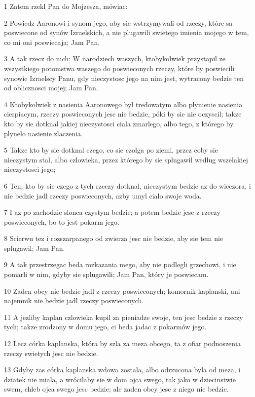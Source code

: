 \par 1 Zatem rzekl Pan do Mojzesza, mówiac:
\par 2 Powiedz Aaronowi i synom jego, aby sie wstrzymywali od rzeczy, które sa poswiecone od synów Izraelskich, a nie plugawili swietego imienia mojego w tem, co mi oni poswiecaja; Jam Pan.
\par 3 A tak rzecz do nich: W narodziech waszych, ktobykolwiek przystapil ze wszystkiego potomstwa waszego do poswieconych rzeczy, które by poswiecili synowie Izraelscy Panu, gdy nieczystosc jego na nim jest, wytracony bedzie ten od oblicznosci mojej; Jam Pan.
\par 4 Ktobykolwiek z nasienia Aaronowego byl tredowatym albo plynienie nasienia cierpiacym, rzeczy poswieconych jesc nie bedzie, póki by sie nie oczyscil; takze kto by sie dotknal jakiej nieczystosci ciala zmarlego, albo tego, z którego by plynelo nasienie zlaczenia.
\par 5 Takze kto by sie dotknal czego, co sie czolga po ziemi, przez coby sie nieczystym stal, albo czlowieka, przez którego by sie splugawil wedlug wszelakiej nieczystosci jego;
\par 6 Ten, kto by sie czego z tych rzeczy dotknal, nieczystym bedzie az do wieczora, i nie bedzie jadl rzeczy poswieconych, azby umyl cialo swoje woda.
\par 7 I az po zachodzie slonca czystym bedzie; a potem bedzie jesc z rzeczy poswieconych, bo to jest pokarm jego.
\par 8 Scierwu tez i rozszarpanego od zwierza jesc nie bedzie, aby sie tem nie splugawil; Jam Pan.
\par 9 A tak przestrzegac beda rozkazania mego, aby nie podlegli grzechowi, i nie pomarli w nim, gdyby sie splugawili; Jam Pan, który je poswiecam.
\par 10 Zaden obcy nie bedzie jadl z rzeczy poswieconych; komornik kaplanski, ani najemnik nie bedzie jadl rzeczy poswieconych.
\par 11 A jezliby kaplan czlowieka kupil za pieniadze swoje, ten jesc bedzie z rzeczy tych; takze zrodzony w domu jego, ci beda jadac z pokarmów jego.
\par 12 Lecz córka kaplanska, która by szla za meza obcego, ta z ofiar podnoszenia rzeczy swietych jesc nie bedzie.
\par 13 Gdyby zas córka kaplanska wdowa zostala, albo odrzucona byla od meza, i dziatek nie miala, a wrócilaby sie w dom ojca swego, tak jako w dziecinstwie swem, chleb ojca swego jesc bedzie; ale zaden obcy jesc z niego nie bedzie.
